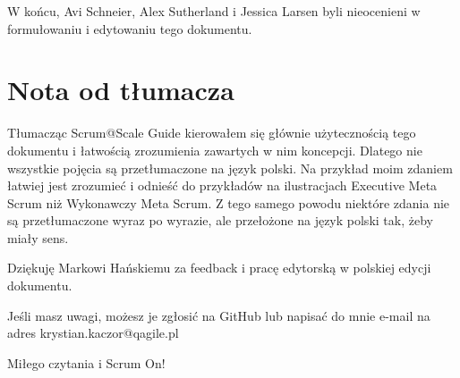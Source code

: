 \documentclass[12pt,a4paper,parskip=full]{scrartcl}
\begin{document}
W końcu, Avi Schneier, Alex Sutherland i Jessica Larsen byli nieocenieni w formułowaniu i edytowaniu tego dokumentu.

\section{Nota od tłumacza}

Tłumacząc Scrum@Scale Guide kierowałem się głównie użytecznością tego dokumentu i łatwością zrozumienia zawartych w nim koncepcji. Dlatego nie wszystkie pojęcia są przetłumaczone na język polski. Na przykład moim zdaniem łatwiej jest zrozumieć i odnieść do przykładów na ilustracjach Executive Meta Scrum niż Wykonawczy Meta Scrum. Z tego samego powodu niektóre zdania nie są przetłumaczone wyraz po wyrazie, ale przełożone na język polski tak, żeby miały sens. 

Dziękuję Markowi Hańskiemu za feedback i pracę edytorską w polskiej edycji dokumentu.

Jeśli masz uwagi, możesz je zgłosić na GitHub lub napisać do mnie e-mail na adres krystian.kaczor@qagile.pl

Miłego czytania i Scrum On!
\pagebreak

\printbibliography
\end{document}
